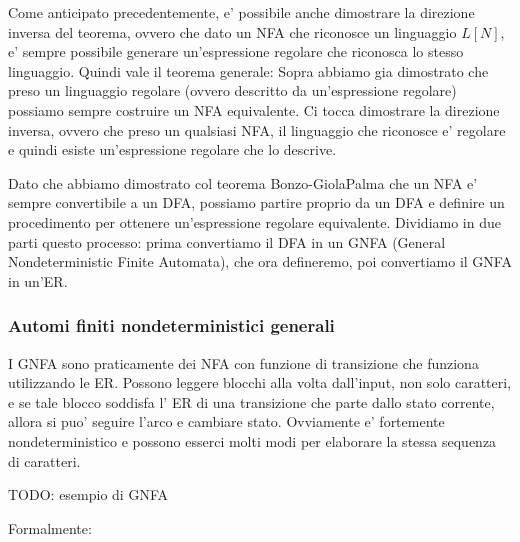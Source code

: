 Come anticipato precedentemente, e' possibile anche dimostrare la direzione inversa del teorema, ovvero che dato un NFA che riconosce un linguaggio $ L[N] $, e' sempre possibile generare un'espressione regolare che riconosca lo stesso linguaggio. Quindi vale il teorema generale:
Sopra abbiamo gia dimostrato che preso un linguaggio regolare (ovvero descritto da un'espressione regolare) possiamo sempre costruire un NFA equivalente. Ci tocca dimostrare la direzione inversa, ovvero che preso un qualsiasi NFA, il linguaggio che riconosce e' regolare e quindi esiste un'espressione regolare che lo descrive.

Dato che abbiamo dimostrato col teorema Bonzo-GiolaPalma che un NFA e' sempre convertibile a un DFA, possiamo partire proprio da un DFA e definire un procedimento per ottenere un'espressione regolare equivalente. Dividiamo in due parti questo processo: prima convertiamo il DFA in un GNFA (General Nondeterministic Finite Automata), che ora defineremo, poi convertiamo il GNFA in un'ER.

\subsubsection{Automi finiti nondeterministici generali}
I GNFA sono praticamente dei NFA con funzione di transizione che funziona utilizzando le ER. Possono leggere blocchi alla volta dall'input, non solo caratteri, e se tale blocco soddisfa l' ER di una transizione che parte dallo stato corrente, allora si puo' seguire l'arco e cambiare stato. Ovviamente e' fortemente nondeterministico e possono esserci molti modi per elaborare la stessa sequenza di caratteri. 

TODO: esempio di GNFA

Formalmente:
 
